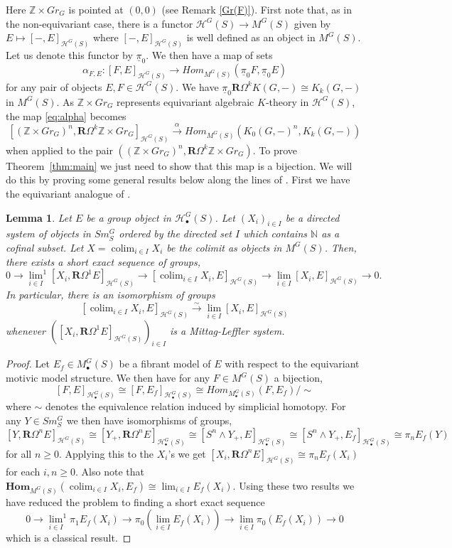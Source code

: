 \documentclass[11pt,twoside]{amsart}
\newtheorem{lemma}[theorem]{Lemma}
\theoremstyle{definition}
\theoremstyle{remark}
\numberwithin{equation}{section}
\newcommand{\mc}{\mathcal}
\newcommand{\ZZ}{\mathbb{Z}}
\newcommand{\iso}{\xrightarrow{\sim}}
\DeclareMathOperator*{\colim}{colim}
\begin{document}
Here $\ZZ\times Gr_G$ is pointed at $(0,0)$ (see Remark \ref{Gr(F)}). First note that, as in the non-equivariant case, there is a functor $\mc{H}^G(S)\to M^G(S)$ given by $E\mapsto [-,E]_{\mc{H}^G(S)}$ 
	where $[-,E]_{\mc{H}^G(S)}$ is well defined as an object in $M^G(S)$. Let us denote this functor by $\underline{\pi}_0$. We then have a map of sets
	\begin{equation}\label{eq:alpha}
	\alpha_{F,E}: [F,E]_{\mc{H}^G(S)}\to Hom_{M^G(S)}(\underline{\pi}_0F,\underline{\pi}_0E)
	\end{equation}
	for any pair of objects $E,F\in \mc{H}^G(S)$. We have $\underline{\pi}_0\mathbf{R}\Omega^k K(G,-)\cong K_k(G,-)$ in $M^G(S)$. As $\ZZ\times Gr_G$ represents equivariant algebraic $K$-theory in $\mc{H}^G(S)$, the map \ref{eq:alpha} becomes
	\[ [(\ZZ\times Gr_G)^n,\mathbf{R}\Omega^k\ZZ\times Gr_G]_{\mc{H}^G(S)}\xrightarrow{\alpha} Hom_{M^G(S)}(K_0(G,-)^n,K_k(G,-))\]
	when applied to the pair $((\ZZ\times Gr_G)^n,\mathbf{R}\Omega^k\ZZ\times Gr_G)$. To prove Theorem~\ref{thm:main} we just need to show that this map is a bijection. 
	We will do this by proving some general results below along the lines of \cite{R10}. First we have the equivariant analogue of \cite[Lemma~1.2.1]{R10}. 
	\begin{lemma}\label{lem:lim1}
		 Let $E$ be a group object in $\mc{H}_\bullet^G(S)$. Let $(X_i)_{i\in I}$ be a directed system of objects in $Sm^G_S$ ordered by the directed set $I$ which contains $\mathbb{N}$ as a cofinal subset. Let $X=\colim_{i\in I} X_i$ be the colimit as objects in $M^G(S)$. Then, there exists a short exact sequence of groups,
		\[0\to {\lim_{i\in I}}^1 [X_i,\mathbf{R}\Omega^1 E]_{\mc{H}^G(S)}\to [\colim_{i\in I} X_i, E]_{\mc{H}^G(S)}\to \lim_{i\in I} [X_i, E]_{\mc{H}^G(S)}\to 0 .\]
		In particular, there is an isomorphism of groups
		\[ [\colim_{i\in I} X_i, E]_{\mc{H}^G(S)}\iso \lim_{i\in I} [X_i, E]_{\mc{H}^G(S)} \]
		whenever $([X_i,\mathbf{R}\Omega^1E]_{\mc{H}^G(S)})_{i\in I}$ is a Mittag-Leffler system.
	\end{lemma}
	\begin{proof}
		Let $E_f\in M_\bullet^G(S)$ be a fibrant model of $E$ with respect to the equivariant motivic model structure. We then have for any $F\in M^G(S)$ a bijection,
		\[ [F, E]_{\mc{H}_\bullet^G(S)}\cong [F, E_f]_{\mc{H}_\bullet^G(S)}\cong Hom_{M_\bullet^G(S)}(F, E_f)/\sim \]
		where $\sim$ denotes the equivalence relation induced by simplicial homotopy. For any $Y\in Sm^G_S$ we then have isomorphisms of groups,
		\[ [Y, \mathbf{R}\Omega^n E]_{\mc{H}^G(S)}\cong [Y_+, \mathbf{R}\Omega^n E]_{\mc{H}_\bullet^G(S)} \cong [S^n\wedge Y_+,E]_{\mc{H}_\bullet^G(S)}\cong [S^n\wedge Y_+,E_f]_{\mc{H}_\bullet^G(S)}\cong \pi_n E_f(Y)\]  
		for all $n\geq 0$. Applying this to the $X_i$'s we get $[X_i, \mathbf{R}\Omega^n E]_{\mc{H}^G(S)}\cong \pi_nE_f(X_i)$ for each $i,n\geq 0$. Also note that $\mathbf{Hom}_{M^G(S)}(\colim_{i\in I} X_i,E_f)\cong \lim_{i\in I}E_f(X_i)$. Using these two results we have reduced the problem to finding a short exact sequence
		\[0\to {\lim_{i\in I}}^1\pi_1 E_f(X_i)\to \pi_0 (\lim_{i\in I}E_f(X_i))\to \lim_{i\in I}\pi_0(E_f(X_i))\to 0\]
		 which is a classical result\cite[Section VI.2]{GJ99}.
		\end{proof}
\end{document}
